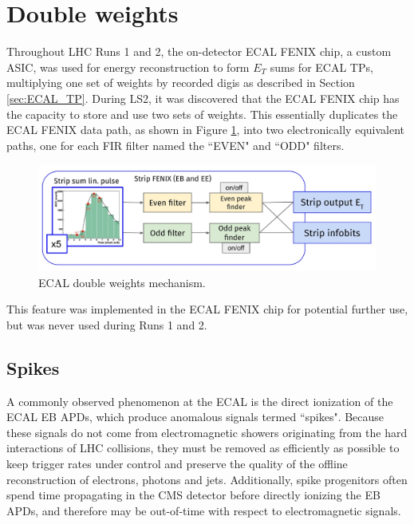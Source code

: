 \section{Double weights} \label{sec:DW}

Throughout LHC Runs 1 and 2, the on-detector ECAL FENIX chip, a custom ASIC, was used for energy reconstruction to form $E_{T}$ sums for ECAL TPs, multiplying one set of weights by recorded digis as described in Section \ref{sec:ECAL_TP}. During LS2, it was discovered that the ECAL FENIX chip has the capacity to store and use two sets of weights. This essentially duplicates the ECAL FENIX data path, as shown in Figure \ref{fig:DW_Diagram}, into two electronically equivalent paths, one for each FIR filter named the ``EVEN" and ``ODD" filters.

\begin{figure}[H]
    \centering
    \includegraphics[width=\textwidth]{Images/ECAL/DW/ECAL_DW_Schematic.png}
    \caption{ECAL double weights mechanism.}
    \label{fig:DW_Diagram}
\end{figure}

This feature was implemented in the ECAL FENIX chip for potential further use, but was never used during Runs 1 and 2. 

\subsection{Spikes} \label{sec:spikes}

A commonly observed phenomenon at the ECAL is the direct ionization of the ECAL EB APDs, which produce anomalous signals termed ``spikes". Because these signals do not come from electromagnetic showers originating from the hard interactions of LHC collisions, they must be removed as efficiently as possible to keep trigger rates under control and preserve the quality of the offline reconstruction of electrons, photons and jets. Additionally, spike progenitors often spend time propagating in the CMS detector before directly ionizing the EB APDs, and therefore may be out-of-time with respect to electromagnetic signals.

